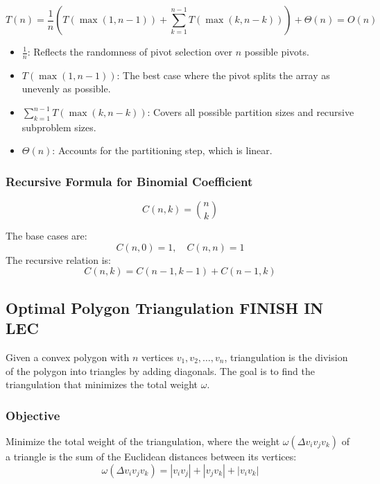 \begin{definition}
        \begin{equation*}
        T(n) = \frac{1}{n} \left( T(\max(1, n-1)) + \sum_{k=1}^{n-1} T(\max(k, n-k)) \right) + \Theta(n) = O(n)
        \end{equation*}

        \begin{itemize}
            \item \( \frac{1}{n} \): Reflects the randomness of pivot selection over \( n \) possible pivots.
            \item \( T(\max(1, n-1)) \): The best case where the pivot splits the array as unevenly as possible.
            \item \( \sum_{k=1}^{n-1} T(\max(k, n-k)) \): Covers all possible partition sizes and recursive subproblem sizes.
            \item \( \Theta(n) \): Accounts for the partitioning step, which is linear.
        \end{itemize}
    \end{definition}



\subsubsection{Recursive Formula for Binomial Coefficient}
\begin{definition}
    \begin{equation}
        C(n,k) = \binom{n}{k}
    \end{equation}
        
        The base cases are:
        \[
        C(n, 0) = 1, \quad C(n, n) = 1
        \]
        The recursive relation is:
        \[
        C(n, k) = C(n-1, k-1) + C(n-1, k)
        \]
\end{definition}

\subsection{Optimal Polygon Triangulation FINISH IN LEC}

\begin{definition}
    Given a convex polygon with \(n\) vertices \(v_1, v_2, \dots, v_n\), triangulation is the division of the polygon into triangles by adding diagonals. The goal is to find the triangulation that minimizes the total weight \(\omega\).
\end{definition}
    
\subsubsection{Objective}
\begin{definition}
    Minimize the total weight of the triangulation, where the weight \(\omega(\Delta v_i v_j v_k)\) of a triangle is the sum of the Euclidean distances between its vertices:
    \begin{equation}
        \omega(\Delta v_i v_j v_k) = |v_i v_j| + |v_j v_k| + |v_i v_k|
    \end{equation}
\end{definition}    

